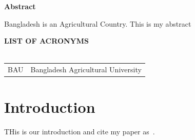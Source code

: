 \documentclass[a4paper,12pt,oneside]{book}
\newcommand{\blanklineR}{\hfill \\} %
\newcommand{\HeadingR}[1]{%
{\large			%
\bfseries{#1}}}
\begin{document}
\newpage
{} \label{abstr}

\begin{center}
\HeadingR{Abstract}
\end{center}
Bangladesh is an Agricultural Country. This is my abstract


\newpage
{}
\begin{singlespacing}
\tableofcontents
\end{singlespacing}
\newpage
{} \label{listoftab}
\listoftables
{}	%
\newpage
{} \label{listoffig}
\listoffigures
{}	%

\newpage
{} \label{abbrv}

\begin{center}
\HeadingR{\MakeUppercase{List of Acronyms}}
\blanklineR \blanklineR
\begin{longtable}{l@{\qquad}l}
BAU & Bangladesh Agricultural University  \\
\end{longtable}
\end{center}

\mainmatter
{} %
\chapter{Introduction}\label{chap:intro}

THis is our introduction and cite my paper as~\cite{bird2020optimisation}. 
\end{document}
